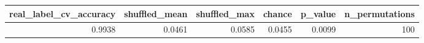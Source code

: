\begin{tabular}{rrrrrr}
\toprule
real_label_cv_accuracy & shuffled_mean & shuffled_max & chance & p_value & n_permutations \\
\midrule
0.9938 & 0.0461 & 0.0585 & 0.0455 & 0.0099 & 100 \\
\bottomrule
\end{tabular}
